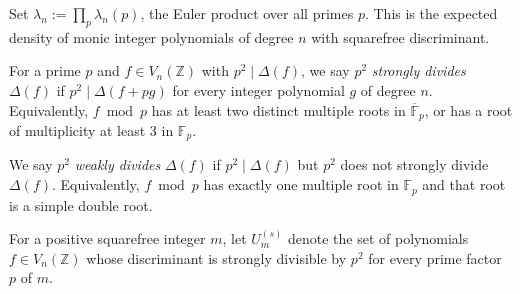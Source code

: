 \begin{definition}
  \label{def:euler_product}
  Set \(\lambda_n:=\prod_p \lambda_n(p)\), the Euler product over all
  primes \(p\).  This is the expected density of monic integer
  polynomials of degree \(n\) with squarefree discriminant.
\end{definition}


\begin{definition}
  \label{def:strong_divisibility}
  For a prime \(p\) and \(f\in V_n(\mathbb{Z})\) with \(p^2\mid\Delta(f)\),
  we say \(p^2\) \emph{strongly divides} \(\Delta(f)\) if
  \(p^2\mid\Delta(f+pg)\) for every integer polynomial \(g\) of
  degree \(n\).  Equivalently, \(f\bmod p\) has at least two distinct
  multiple roots in \(\overline{\mathbb{F}}_p\), or has a root of
  multiplicity at least \(3\) in \(\mathbb{F}_p\).
\end{definition}

\begin{definition}
  \label{def:weak_divisibility}
  We say \(p^2\) \emph{weakly divides} \(\Delta(f)\) if \(p^2\mid\Delta(f)\)
  but \(p^2\) does not strongly divide \(\Delta(f)\).  Equivalently,
  \(f\bmod p\) has exactly one multiple root in \(\mathbb{F}_p\) and
  that root is a simple double root.
\end{definition}

\begin{definition}
  \label{def:U_m_strong}
  For a positive squarefree integer \(m\), let \(U_m^{(s)}\) denote
  the set of polynomials \(f\in V_n(\mathbb{Z})\) whose discriminant
  is strongly divisible by \(p^2\) for every prime factor \(p\) of \(m\).
\end{definition}

